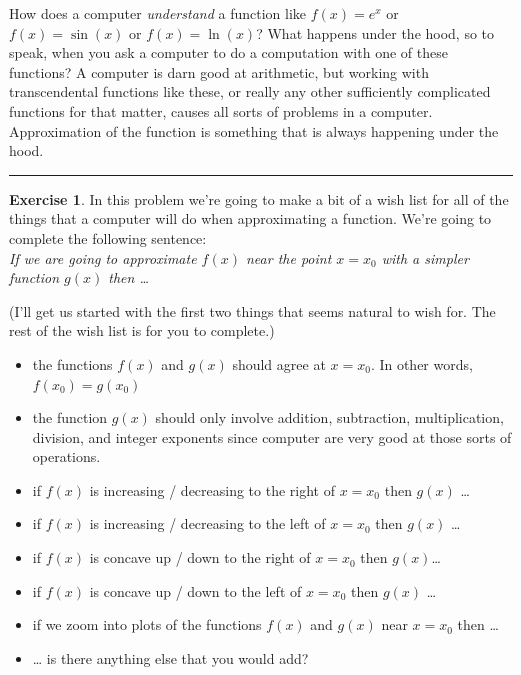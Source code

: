 \documentclass[
]{book}
\providecommand{\tightlist}{%
  \setlength{\itemsep}{0pt}\setlength{\parskip}{0pt}}
\theoremstyle{definition}
\theoremstyle{definition}
\theoremstyle{definition}
\newtheorem{exercise}{Exercise}[chapter]
\theoremstyle{remark}
\begin{document}
How does a computer \emph{understand} a function like \(f(x) = e^x\) or \(f(x) = \sin(x)\) or \(f(x) = \ln(x)\)? What happens under the hood, so to speak, when you ask a computer to do a computation with one of these functions? A computer is darn good at arithmetic, but working with transcendental functions like these, or really any other sufficiently complicated functions for that matter, causes all sorts of problems in a computer. Approximation of the function is something that is always happening under the hood.

\begin{center}\rule{0.5\linewidth}{0.5pt}\end{center}

\begin{exercise}
\protect\hypertarget{exr:unnamed-chunk-28}{}{\label{exr:unnamed-chunk-28} }In this problem we're going to make a bit of a wish list for all of the things that a computer will do when approximating a function. We're going to complete the following sentence:\\
\emph{If we are going to approximate \(f(x)\) near the point \(x=x_0\) with a simpler function \(g(x)\) then \ldots{}}

(I'll get us started with the first two things that seems natural to wish for. The rest of the wish list is for you to complete.)

\begin{itemize}
\tightlist
\item
  the functions \(f(x)\) and \(g(x)\) should agree at \(x=x_0\). In other words, \(f(x_0) = g(x_0)\)
\item
  the function \(g(x)\) should only involve addition, subtraction, multiplication, division, and integer exponents since computer are very good at those sorts of operations.
\item
  if \(f(x)\) is increasing / decreasing to the right of \(x=x_0\) then \(g(x)\) \ldots{}
\item
  if \(f(x)\) is increasing / decreasing to the left of \(x=x_0\) then \(g(x)\) \ldots{}
\item
  if \(f(x)\) is concave up / down to the right of \(x=x_0\) then \(g(x)\)\ldots{}
\item
  if \(f(x)\) is concave up / down to the left of \(x=x_0\) then \(g(x)\) \ldots{}
\item
  if we zoom into plots of the functions \(f(x)\) and \(g(x)\) near \(x=x_0\) then \ldots{}
\item
  \ldots{} is there anything else that you would add?
\end{itemize}
\end{exercise}
\end{document}
